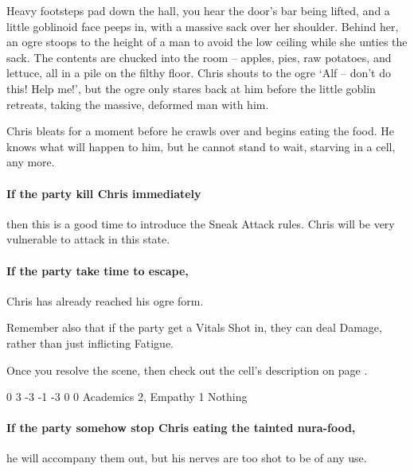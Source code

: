 \begin{multicols}{2}
\begin{boxtext}

	Heavy footsteps pad down the hall, you hear the door's bar being lifted, and a little goblinoid face peeps in, with a massive sack over her shoulder.
	Behind her, an ogre stoops to the height of a man to avoid the low ceiling while she unties the sack.
	The contents are chucked into the room -- apples, pies, raw potatoes, and lettuce, all in a pile on the filthy floor.
	Chris shouts to the ogre `Alf -- don't do this! Help me!', but the ogre only stares back at him before the little goblin retreats, taking the massive, deformed man with him.

\end{boxtext}

Chris bleats for a moment before he crawls over and begins eating the food.
He knows what will happen to him, but he cannot stand to wait, starving in a cell, any more.

\paragraph{If the party kill Chris immediately}
then this is a good time to introduce the Sneak Attack rules.
Chris will be very vulnerable to attack in this state.

\paragraph{If the party take time to escape,}
Chris has already reached his ogre form.

Remember also that if the party get a Vitals Shot in, they can deal Damage, rather than just inflicting Fatigue.

Once you resolve the scene, then check out the cell's description on page \pageref{entrycell}.

{0}%
{3}%
{{-3}%
{-1}%
{-3}}%
{0}%
{0}%
{Academics 2, Empathy 1}%
{Nothing}%
{}

\paragraph{If the party somehow stop Chris eating the tainted nura-food,}
he will accompany them out, but his nerves are too shot to be of any use.

\label{alf}


\end{multicols}
